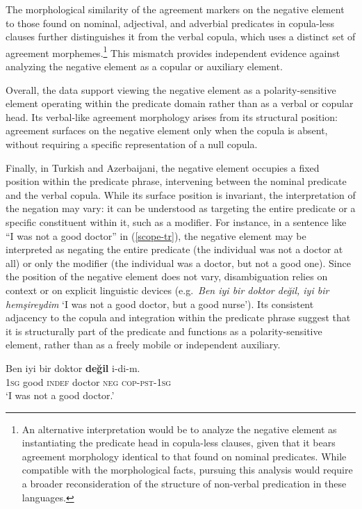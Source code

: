 \documentclass[10pt, a4paper]{article}
\newcommand{\gl}[1]{\textsc{#1}}
\begin{document}
The morphological similarity of the agreement markers on the negative element to those found on nominal, adjectival, and adverbial predicates in copula-less clauses further distinguishes it from the verbal copula, which uses a distinct set of agreement morphemes.\footnote{An alternative interpretation would be to analyze the negative element as instantiating the predicate head in copula-less clauses, given that it bears agreement morphology identical to that found on nominal predicates. While compatible with the morphological facts, pursuing this analysis would require a broader reconsideration of the structure of non-verbal predication in these languages.} This mismatch provides independent evidence against analyzing the negative element as a copular or auxiliary element.

Overall, the data support viewing the negative element as a polarity-sensitive element operating within the predicate domain rather than as a verbal or copular head. Its verbal-like agreement morphology arises from its structural position: agreement surfaces on the negative element only when the copula is absent, without requiring a specific representation of a null copula.

Finally, in Turkish and Azerbaijani, the negative element occupies a fixed position within the predicate phrase, intervening between the nominal predicate and the verbal copula.
While its surface position is invariant, the interpretation of the negation may vary: it can be understood as targeting the entire predicate or a specific constituent within it, such as a modifier.
For instance, in a sentence like ``I was not a good doctor'' in (\ref{scope-tr}), the negative element may be interpreted as negating the entire predicate (the individual was not a doctor at all) or only the modifier (the individual was a doctor, but not a good one).
Since the position of the negative element does not vary, disambiguation relies on context or on explicit linguistic devices (e.g.\ \textit{Ben iyi bir doktor değil, iyi bir hemşireydim} `I was not a good doctor, but a good nurse').
Its consistent adjacency to the copula and integration within the predicate phrase suggest that it is structurally part of the predicate and functions as a polarity-sensitive element, rather than as a freely mobile or independent auxiliary.

\begin{exe}
    \ex\label{scope-tr}
    \gll Ben iyi bir doktor \textbf{değil} i-di-m.\\
    1\gl{sg} good \gl{indef} doctor \gl{neg} \gl{cop}-\gl{pst}-1\gl{sg}\\
    \glt `I was not a good doctor.'
\end{exe}
\end{document}
